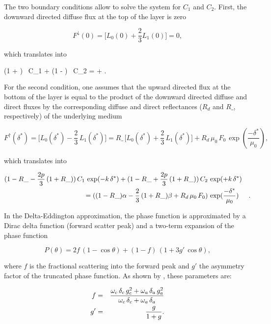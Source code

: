 The two boundary conditions allow to solve the system for $C_1$ and $C_2$.
First, the downward directed diffuse flux at the top of the layer is zero

\medskip
\[
F^{\!\downarrow}(0) = \bigl[ L_0(0) + \frac{2}{3} L_1(0) \bigr] = 0,
\]

\noindent which translates into

\be
(1 + ) \, C_1 + (1 - ) \, C_2 = \alpha + .
\label{ecmwf323}
\ee
\medskip

\noindent For the second condition, one assumes that the upward directed flux
at the bottom of the layer is equal to the product of the downward directed
diffuse and direct fluxes by the corresponding diffuse and direct reflectances
($R_d$ and $R\_$, respectively) of the underlying medium

\medskip
\[
F^{\!\uparrow}(\delta^{*}) = \bigl[ L_0(\delta^{*}) - \frac{2}{3} \, L_1(\delta^{*}) \bigr] = R\_ \, \bigl[ L_0(\delta^{*}) + \frac{2}{3} \, L_1(\delta^{*}) \bigr] + R_d \, \mu_0 \, F_0 \, \exp(\frac{-\delta^{*}}{\mu_0}),
\]
\medskip

\noindent which translates into

\medskip
\begin{eqnarray}\label{ecmwf324}
(1 - R\_ - \frac{2p}{3} \, (1 + R\_) ) \, C_1 \, \exp(-k \, \delta^{*}) +
(1 - R\_ + \frac{2p}{3} \, (1 + R\_) ) \, C_2 \, &\exp(+k \, \delta^{*})& \cr
\mbox{} = ( (1 - R\_)\alpha - \frac{2}{3} \, (1 + R\_)\beta +
R_d \, \mu_0 \, F_0 ) \, &\exp(\frac{-\delta^{*}}{\mu_0})&.
\end{eqnarray}
\medskip

In the Delta-Eddington approximation, the phase function is approximated by a
Dirac delta function (forward scatter peak) and a two-term expansion of the
phase function

\medskip
\[
P(\theta) = 2 f \, (1 - \cos\theta) + (1 - f) \, (1 + 3g' \, \cos\theta),
\]

\noindent where $f$ is the fractional scattering into the forward peak and $g'$ the asymmetry factor of the truncated phase function. As shown by \citet{Joseph1976}, these parameters are:

\medskip
\begin{eqnarray}\label{ecmwf325}
f  &=&  \frac{\omega_c \, \delta_c \, g_c^2+ \omega_a \, \delta_a \, g_a^2}
{\omega_c \, \delta_c + \omega_a \, \delta_a} \cr
g' &=& \frac{g}{1+g}.
\end{eqnarray}

